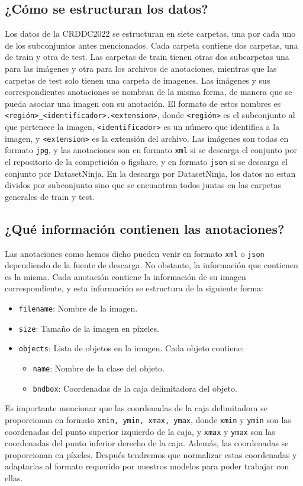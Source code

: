 \subsection{¿Cómo se estructuran los datos?}
Los datos de la CRDDC2022 se estructuran en siete carpetas, una por cada uno de los subconjuntos antes mencionados. Cada carpeta contiene dos carpetas, una de train y otra de test. Las carpetas de train tienen otras dos subcarpetas una para las imágenes y otra para los archivos de anotaciones, mientras que las carpetas de test solo tienen una carpeta de imagenes. Las imágenes y sus correspondientes anotaciones se nombran de la misma forma, de manera que se pueda asociar una imagen con su anotación. El formato de estos nombres es \texttt{<región>\_<identificador>.<extension>}, donde \texttt{<región>} es el subconjunto al que pertenece la imagen, \texttt{<identificador>} es un número que identifica a la imagen, y \texttt{<extension>} es la extensión del archivo. Las imágenes son todas en formato \texttt{jpg}, y las anotaciones son en formato \texttt{xml} si se descarga el conjunto por el repositorio de la competición o figshare, y en formato \texttt{json} si se descarga el conjunto por DatasetNinja. En la descarga por DatasetNinja, los datos no estan dividos por subconjunto sino que se encuantran todos juntas en las carpetas generales de train y test.


\subsection{¿Qué información contienen las anotaciones?}
Las anotaciones como hemos dicho pueden venir en formato \texttt{xml} o \texttt{json} dependiendo de la fuente de descarga. No obstante, la información que contienen es la misma. Cada anotación contiene la información de su imagen correspondiente, y esta información se estructura de la siguiente forma:
\begin{itemize}
    \item \texttt{filename}: Nombre de la imagen.
    \item \texttt{size}: Tamaño de la imagen en píxeles.
    \item \texttt{objects}: Lista de objetos en la imagen. Cada objeto contiene:
    \begin{itemize}
        \item \texttt{name}: Nombre de la clase del objeto.
        \item \texttt{bndbox}: Coordenadas de la caja delimitadora del objeto.
    \end{itemize}
\end{itemize}
Es importante mencionar que las coordenadas de la caja delimitadora se proporcionan en formato \texttt{xmin, ymin, xmax, ymax}, donde \texttt{xmin} y \texttt{ymin} son las coordenadas del punto superior izquierdo de la caja, y \texttt{xmax} y \texttt{ymax} son las coordenadas del punto inferior derecho de la caja. Además, las coordenadas se proporcionan en píxeles. Después tendremos que normalizar estas coordenadas y adaptarlas al formato requerido por nuestros modelos para poder trabajar con ellas.

